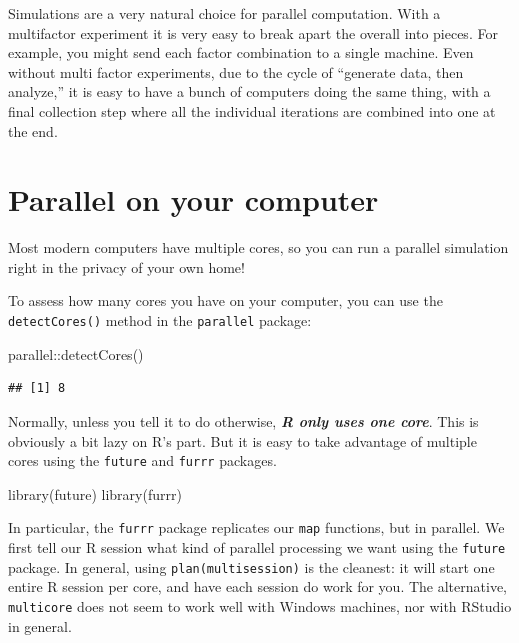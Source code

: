 \documentclass[
]{book}
\newenvironment{Shaded}{\begin{snugshade}}{\end{snugshade}}
\newcommand{\FunctionTok}[1]{\textcolor[rgb]{0.00,0.00,0.00}{#1}}
\newcommand{\NormalTok}[1]{#1}
\newcommand{\SpecialCharTok}[1]{\textcolor[rgb]{0.00,0.00,0.00}{#1}}
\begin{document}
Simulations are a very natural choice for parallel computation.
With a multifactor experiment it is very easy to break apart the overall into pieces.
For example, you might send each factor combination to a single machine.
Even without multi factor experiments, due to the cycle of ``generate data, then analyze,'' it is easy to have a bunch of computers doing the same thing, with a final collection step where all the individual iterations are combined into one at the end.

\hypertarget{parallel-on-your-computer}{%
\section{Parallel on your computer}\label{parallel-on-your-computer}}

Most modern computers have multiple cores, so you can run a parallel simulation right in the privacy of your own home!

To assess how many cores you have on your computer, you can use the \texttt{detectCores()} method in the \texttt{parallel} package:

\begin{Shaded}
\begin{Highlighting}[]
\NormalTok{parallel}\SpecialCharTok{::}\FunctionTok{detectCores}\NormalTok{()}
\end{Highlighting}
\end{Shaded}

\begin{verbatim}
## [1] 8
\end{verbatim}

Normally, unless you tell it to do otherwise, \textbf{\emph{R only uses one core}}.
This is obviously a bit lazy on R's part.
But it is easy to take advantage of multiple cores using the \texttt{future} and \texttt{furrr} packages.

\begin{Shaded}
\begin{Highlighting}[]
\FunctionTok{library}\NormalTok{(future)}
\FunctionTok{library}\NormalTok{(furrr)}
\end{Highlighting}
\end{Shaded}

In particular, the \texttt{furrr} package replicates our \texttt{map} functions, but in parallel.
We first tell our R session what kind of parallel processing we want using the \texttt{future} package.
In general, using \texttt{plan(multisession)} is the cleanest: it will start one entire R session per core, and have each session do work for you.
The alternative, \texttt{multicore} does not seem to work well with Windows machines, nor with RStudio in general.
\end{document}
